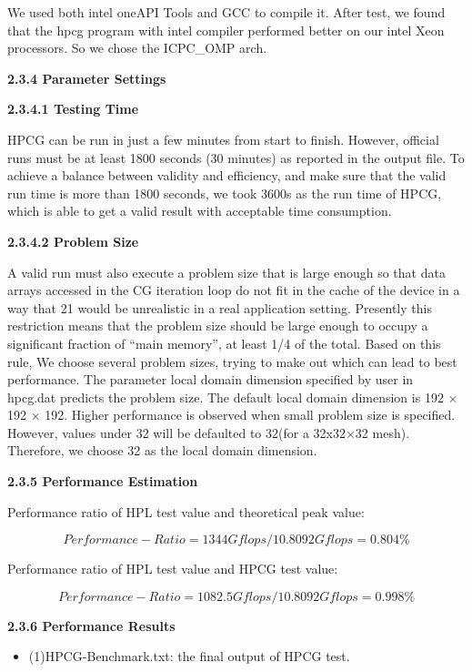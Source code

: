 \documentclass[a4paper,12pt]{article}
\begin{document}
We used both intel oneAPI Tools and GCC to compile it. After test, we found that the hpcg program with intel compiler performed better on our intel Xeon processors. So we chose the ICPC\_OMP arch.

\textbf{2.3.4 Parameter Settings}

\textbf{2.3.4.1 Testing Time}

HPCG can be run in just a few minutes from start to finish. However, official runs must be at least 1800 seconds (30 minutes) as reported in the output file. To achieve a balance between validity and efficiency, and make sure that the valid run time is more than 1800 seconds, we took 3600s as the run time of HPCG, which is able to get a valid result with acceptable time consumption.

\textbf{2.3.4.2 Problem Size}

A valid run must also execute a problem size that is large enough so that data arrays accessed in the CG iteration loop do not fit in the cache of the device in a way that 21 would be unrealistic in a real application setting. Presently this restriction means that the problem size should be large enough to occupy a significant fraction of “main memory”, at least 1/4 of the total. Based on this rule, We choose several problem sizes, trying to make out which can lead to best performance.
The parameter local domain dimension specified by user in hpcg.dat predicts the problem size. The default local domain dimension is 192 × 192 × 192. Higher performance is observed when small problem size is specified. However, values under 32 will be defaulted to 32(for a 32x32×32 mesh). Therefore, we choose 32 as the local domain dimension.

\textbf{2.3.5 Performance Estimation}

Performance ratio of HPL test value and theoretical peak value:

\begin{equation*}
Performance-Ratio = 1344Gflops/10.8092Gflops = 0.804\%
\end{equation*}

Performance ratio of HPL test value and HPCG test value:

\begin{equation*}
Performance-Ratio = 1082.5Gflops/10.8092Gflops = 0.998\%
\end{equation*}

\textbf{2.3.6 Performance Results}
\begin{itemize}
    \item (1)HPCG-Benchmark.txt: the final output of HPCG test.
\end{itemize}
\end{document}
